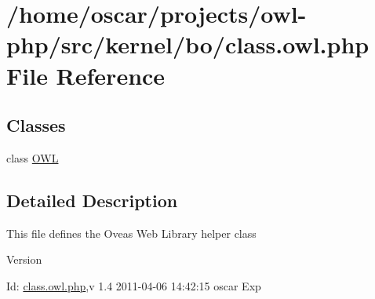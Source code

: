 \section{/home/oscar/projects/owl-\/php/src/kernel/bo/class.owl.php File Reference}
\label{class_8owl_8php}
\subsection*{Classes}
\begin{DoxyCompactItemize}
\item 
class \hyperlink{classOWL}{OWL}
\end{DoxyCompactItemize}


\subsection{Detailed Description}
This file defines the Oveas Web Library helper class \begin{DoxyVersion}{Version}

\end{DoxyVersion}
\begin{DoxyParagraph}{Id:}
\hyperlink{class_8owl_8php}{class.owl.php},v 1.4 2011-\/04-\/06 14:42:15 oscar Exp 
\end{DoxyParagraph}
